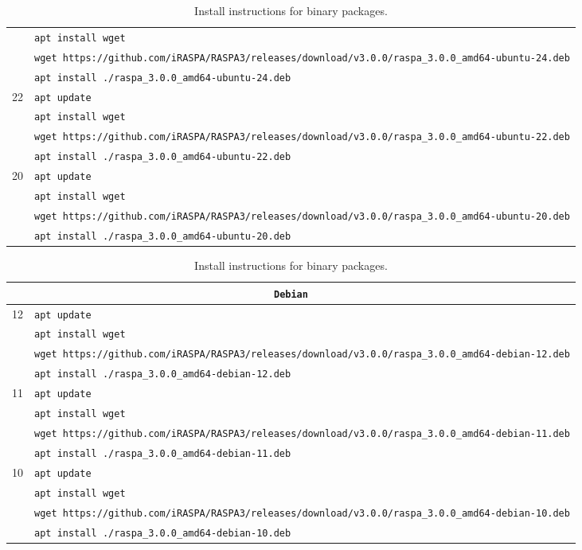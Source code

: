 \begin{table}[p]
\begin{tabularx}{\linewidth}{c|X}
     & \verb+apt install wget+\\
     & \verb+wget https://github.com/iRASPA/RASPA3/releases/download/v3.0.0/raspa_3.0.0_amd64-ubuntu-24.deb+\\
     & \verb+apt install ./raspa_3.0.0_amd64-ubuntu-24.deb+\\
     \hline
  22 & \verb+apt update+\\
     & \verb+apt install wget+\\
     & \verb+wget https://github.com/iRASPA/RASPA3/releases/download/v3.0.0/raspa_3.0.0_amd64-ubuntu-22.deb+\\
     & \verb+apt install ./raspa_3.0.0_amd64-ubuntu-22.deb+\\
     \hline
  20 & \verb+apt update+\\
     & \verb+apt install wget+\\
     & \verb+wget https://github.com/iRASPA/RASPA3/releases/download/v3.0.0/raspa_3.0.0_amd64-ubuntu-20.deb+\\
     & \verb+apt install ./raspa_3.0.0_amd64-ubuntu-20.deb+\\
  \end{tabularx}
  \newline
\vspace*{0.5 cm}
\newline
  \begin{tabularx}{\linewidth}{c|X}
    \multicolumn{2}{c}{\texttt{Debian}}\\
   \hline
  12 & \verb+apt update+\\
     & \verb+apt install wget+\\
     & \verb+wget https://github.com/iRASPA/RASPA3/releases/download/v3.0.0/raspa_3.0.0_amd64-debian-12.deb+\\
     & \verb+apt install ./raspa_3.0.0_amd64-debian-12.deb+\\
     \hline
  11 & \verb+apt update+\\
     & \verb+apt install wget+\\
     & \verb+wget https://github.com/iRASPA/RASPA3/releases/download/v3.0.0/raspa_3.0.0_amd64-debian-11.deb+\\
     & \verb+apt install ./raspa_3.0.0_amd64-debian-11.deb+\\
     \hline
  10 & \verb+apt update+\\
     & \verb+apt install wget+\\
     & \verb+wget https://github.com/iRASPA/RASPA3/releases/download/v3.0.0/raspa_3.0.0_amd64-debian-10.deb+\\
     & \verb+apt install ./raspa_3.0.0_amd64-debian-10.deb+\\
  \end{tabularx}
  \caption{Install instructions for binary packages.}
\end{table}

